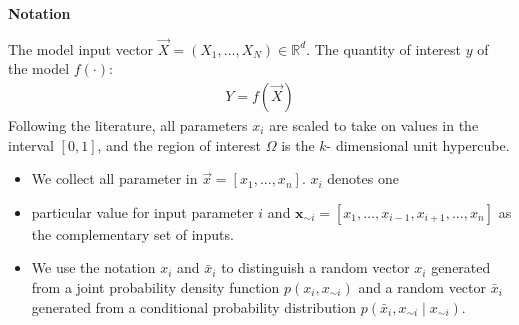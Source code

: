 \begin{frame}\begin{center}
		\LARGE\textbf{Notation}
\end{center}\end{frame}
\begin{frame}
The model input vector $\vec{X} = (X_1, \hdots, X_N) \in \mathbb{R}^d$. The quantity of interest $y$ of the model $f(\cdot)$:
%
\begin{align*}
 Y = f(\vec{X})
\end{align*}
%
Following the literature, all parameters $x_i$ are scaled to take on values in the interval $[0, 1]$, and the region of interest $\Omega$ is the $k$- dimensional unit hypercube.
\end{frame}
\begin{frame}
	\begin{itemize}\setlength\itemsep{1em}
		\item We collect all parameter in $\vec{x} = [x_1, \hdots, x_n]$. $x_i$ denotes one
	\item particular value for input parameter $i$ and $\textbf{x}_{\sim i} =  [x_1, \hdots, x_{i -1}, x_{i + 1}, \hdots, x_n]$ as the complementary set of inputs.
		\item We use the notation $x_i$ and $\bar{x}_{i}$ to distinguish a random vector $x_i$ generated from a joint probability density function $p(x_i, x_{\sim i})$ and a random vector $\bar{x}_i$ generated from a conditional probability distribution $p(\bar{x}_i, x_{\sim i} \mid x_{\sim i})$.
	\end{itemize}
\end{frame}
